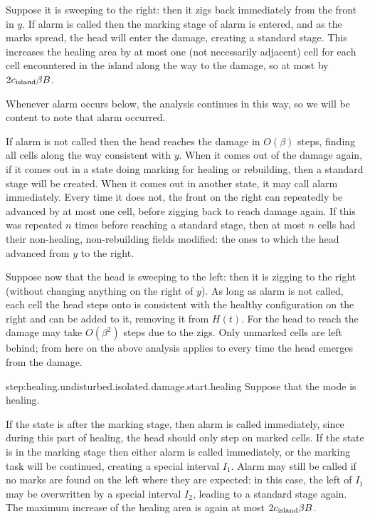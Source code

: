 \documentclass[12pt]{memoir}
\def\B{B}
\renewcommand{\H}{H}
\newcommand{\cns}[1]{c_{\textrm{\upshape #1}}}
\begin{document}
\begin{Proof}
\begin{pproof}
\begin{prooofi}
Suppose it is sweeping to the right: then it zigs back immediately from the front in \( y \).
If alarm is called then the marking stage of alarm is entered, and as the marks spread,
the head will enter the damage, creating a standard stage.
This increases the healing area by at most one (not necessarily adjacent) cell
for each cell encountered in the island along the way to the damage, 
so at most by \( 2\cns{island}\beta\B \).

Whenever alarm occurs below, the analysis continues in this way, so we will be content to
note that alarm occurred.

If alarm is not called then the head reaches the damage in \( O(\beta) \) steps,
finding all cells along the way consistent with \( y \).
When it comes out of the damage again, if it comes out in a state doing marking
for healing or rebuilding, then a standard stage will be created.
When it comes out in another state, it may call alarm immediately.
Every time it does not,
the front on the right can repeatedly be advanced by at most one cell, before
zigging back to reach damage again.
If this was repeated \( n \) times before reaching a standard stage, 
then at most \( n \) cells had their non-healing,
non-rebuilding fields modified: the ones to which the head advanced from \( y \) to the right.

Suppose now that the head is sweeping to the left: then it is zigging
to the right (without changing anything on the right of \( y \)).
As long as alarm is not called, each cell the head steps onto
is consistent with the healthy
configuration on the right and can be added to it, removing it from \( \H(t) \).
For the head to reach the damage may take \( O(\beta^{2}) \) steps due to the zigs.
Only unmarked cells are left behind;
from here on the above analysis applies to every time the head emerges
from the damage.
\end{prooofi} %

\begin{step+}{step:healing.undisturbed.isolated.damage.start.healing}
Suppose that the mode is healing.
\end{step+}
\begin{prooofi}
If  the state is after the marking stage,
then alarm is called immediately, since during this part of
healing, the head should only step on marked cells.
If the state is in the marking stage then either alarm is called
immediately, or the marking task will be continued, creating a 
special interval \( I_{1} \).
Alarm may still be called if no marks are found on the left where they are
expected: in this case, the left of \( I_{1} \) may be overwritten by a special
interval \( I_{2} \), leading to a standard stage again.
The maximum increase of the healing area is again at most \( 2\cns{island}\beta\B \).
\end{prooofi} %


\end{pproof}
\end{Proof}
\end{document}
